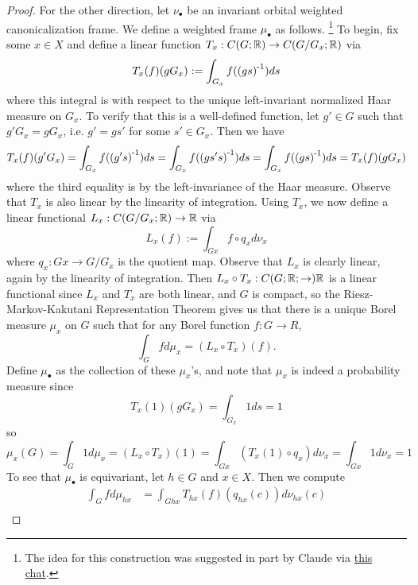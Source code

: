 \begin{theorem}
\begin{proof}
        For the other direction, let $\nu_\bullet$ be an invariant orbital weighted canonicalization frame.
        We define a weighted frame $\mu_\bullet$ as follows.
        \footnote{The idea for this construction was suggested in part by Claude via \href{https://claude.ai/share/d975e47f-d488-4821-8653-ae7bbac49887}{this chat}.}
        To begin, fix some $x \in X$ and define a linear function $T_x : C(G;\mathbb{R}) \to C(G/G_x;\mathbb{R})$ via
        \[
            T_x(f)(gG_x) := \int_{G_x} f(\left( gs \right)^{\text{-}1}) ds
        \]
        where this integral is with respect to the unique left-invariant normalized Haar measure on $G_x$.
        To verify that this is a well-defined function, let $g' \in G$ such that $g'G_x = gG_x$, i.e. $g' = gs'$ for some $s' \in G_x$.
        Then we have
        \[
            T_x(f)(g'G_x)
            = \int_{G_x} f(\left( g's \right)^{\text{-}1}) ds
            = \int_{G_x} f(\left( gs's \right)^{\text{-}1}) ds
            = \int_{G_x} f(\left( gs \right)^{\text{-}1}) ds
            = T_x(f)(gG_x)
        \]
        where the third equality is by the left-invariance of the Haar measure.
        Observe that $T_x$ is also linear by the linearity of integration.
        Using $T_x$, we now define a linear functional $L_x : C(G/G_x;\mathbb{R}) \to \mathbb{R}$ via
        \[
            L_x(f) := \int_{Gx} f \circ q_x d \nu_x
        \]
        where $q_x : Gx \to G/G_x$ is the quotient map.
        Observe that $L_x$ is clearly linear, again by the linearity of integration.
        Then $L_x \circ T_x : C(G;\mathbb{R};\to) \mathbb{R}$ is a linear functional since $L_x$ and $T_x$ are both linear, and $G$ is compact, so the Riesz-Markov-Kakutani Representation Theorem gives us that there is a unique Borel measure $\mu_x$ on $G$ such that for any Borel function $f : G \to R$,
        \[
            \int_G f d \mu_x
            = (L_x \circ T_x) (f).
        \]
        Define $\mu_\bullet$ as the collection of these $\mu_x$'s, and note that $\mu_x$ is indeed a probability measure since
        \[
            T_x(1)(gG_x)
            = \int_{G_x} 1 ds
            = 1
        \]
        so
        \[
            \mu_x (G)
            = \int_G 1 d\mu_x
            = (L_x \circ T_x) (1)
            = \int_{Gx} (T_x(1) \circ q_x) d \nu_x 
            = \int_{Gx} 1 d \nu_x 
            = 1
        \]
        To see that $\mu_\bullet$ is equivariant, let $h \in G$ and $x \in X$.
        Then we compute
        \begin{align*}
            \int_G f d \mu_{hx}
            &= \int_{G hx} T_{hx} (f) (q_{hx}(c)) d \nu_{hx} (c) \\

\end{align*}
\end{proof}
\end{theorem}
